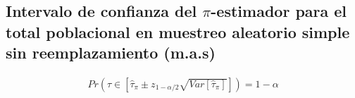 \documentclass{article}
\begin{document}
    \subsection{Intervalo de confianza del $\pi$-estimador para el total poblacional en muestreo aleatorio simple sin reemplazamiento (m.a.s)}

      \begin{align}
        Pr\left(\tau \in \left[\widehat{\tau}_\pi \pm z_{1-\alpha/2}\sqrt{Var[\widehat{\tau}_\pi]}\right]\right) = 1-\alpha
      \end{align}
	\nocite{muest2017}

  
  
\end{document}
